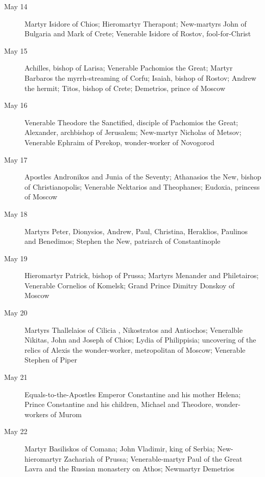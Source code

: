 \begin{description}
\item[May 14]

Martyr Isidore of Chios; Hieromartyr Therapont; New-martyrs John of Bulgaria and Mark of Crete; Venerable Isidore of Rostov, fool-for-Christ

\item[May 15]

Achilles, bishop of Larisa; Venerable Pachomios the Great; Martyr Barbaros the myrrh-streaming of Corfu; Isaiah, bishop of Rostov; Andrew the hermit; Titos, bishop of Crete; Demetrios, prince of Moscow

\item[May 16]

Venerable Theodore the Sanctified, disciple of Pachomios the Great; Alexander, archbishop of Jerusalem; New-martyr Nicholas of Metsov; Venerable Ephraim of Perekop, wonder-worker of Novogorod

\item[May 17]

Apostles Andronikos and Junia of the Seventy; Athanasios the New, bishop of Christianopolis; Venerable Nektarios and Theophanes; Eudoxia, princess of Moscow

\item[May 18]

Martyrs Peter, Dionysios, Andrew, Paul, Christina, Heraklios, Paulinos and Benedimos; Stephen the New, patriarch of Constantinople

\item[May 19]

Hieromartyr Patrick, bishop of Prussa; Martyrs Menander and Philetairos; Venerable Cornelios of Komelsk; Grand Prince Dimitry Donskoy of Moscow

\item[May 20]

Martyrs Thallelaios of Cilicia , Nikostratos and Antiochos; Veneralble Nikitas, John and Joseph of Chios; Lydia of Philippisia; uncovering of the relics of Alexis the wonder-worker, metropolitan of Moscow; Venerable Stephen of Piper

\item[May 21]

Equals-to-the-Apostles Emperor Constantine and his mother Helena; Prince Constantine and his children, Michael and Theodore, wonder-workers of Murom

\item[May 22]

Martyr Basiliskos of Comana; John Vladimir, king of Serbia; New-hieromartyr Zachariah of Prussa; Venerable-martyr Paul of the Great Lavra and the Russian monastery on Athos; Newmartyr Demetrios


\end{description}
